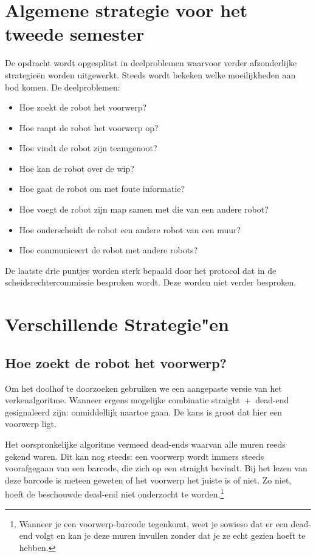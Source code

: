 \documentclass{peno}
\begin{document}
\maketitle

\section*{Algemene strategie voor het tweede semester}

De opdracht wordt opgesplitst in deelproblemen waarvoor verder afzonderlijke strategie\"en worden uitgewerkt. Steeds wordt bekeken welke moeilijkheden aan bod komen. De deelproblemen:
\begin{itemize}
\item Hoe zoekt de robot het voorwerp?
\item Hoe raapt de robot het voorwerp op?
\item Hoe vindt de robot zijn teamgenoot?
\item Hoe kan de robot over de wip?
\item Hoe gaat de robot om met foute informatie?
\item Hoe voegt de robot zijn map samen met die van een andere robot?
\item Hoe onderscheidt de robot een andere robot van een muur?
\item Hoe communiceert de robot met andere robots?
\end{itemize}

De laatste drie puntjes worden sterk bepaald door het protocol dat in de scheidsrechtercommissie besproken wordt. Deze worden niet verder besproken.


\section*{Verschillende Strategie"en}
\subsection*{Hoe zoekt de robot het voorwerp?}

Om het doolhof te doorzoeken gebruiken we een aangepaste versie van het verkenalgoritme. Wanneer ergens mogelijke combinatie straight~+~dead-end gesignaleerd zijn: onmiddellijk naartoe gaan. De kans is groot dat hier een voorwerp ligt.

Het oorspronkelijke algoritme vermeed dead-ends waarvan alle muren reeds gekend waren. Dit kan nog steeds: een voorwerp wordt immers steeds voorafgegaan van een barcode, die zich op een straight bevindt. Bij het lezen van deze barcode is meteen geweten of het voorwerp het juiste is of niet. Zo niet, hoeft de beschouwde dead-end niet onderzocht te worden.\footnote{Wanneer je een voorwerp-barcode tegenkomt, weet je sowieso dat er een dead-end volgt en kan je deze muren invullen zonder dat je ze echt gezien hoeft te hebben.}
\end{document}
